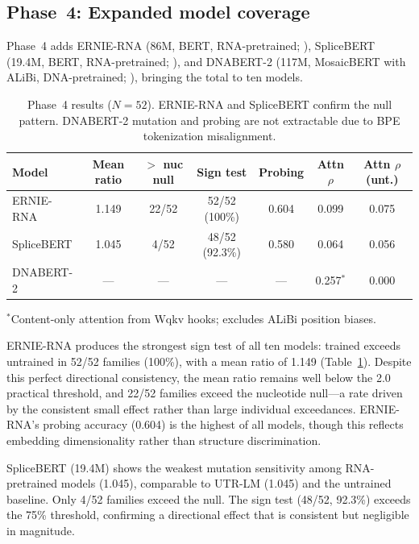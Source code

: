 \documentclass[11pt]{article}
\begin{document}
\subsection{Phase~4: Expanded model coverage}
\label{sec:phase4}

Phase~4 adds ERNIE-RNA (86M, BERT, RNA-pretrained;
\citealp{wang2024ernierna}), SpliceBERT (19.4M, BERT,
RNA-pretrained; \citealp{chen2024splicebert}), and DNABERT-2 (117M,
MosaicBERT with ALiBi, DNA-pretrained; \citealp{zhou2024dnabert2}),
bringing the total to ten models.

\begin{table}[t]
\centering
\caption{Phase~4 results ($N = 52$).  ERNIE-RNA and SpliceBERT
  confirm the null pattern.  DNABERT-2 mutation and probing are not
  extractable due to BPE tokenization misalignment.}
\label{tab:phase4}
\begin{tabular}{@{}lcccccc@{}}
\toprule
\textbf{Model} & \textbf{Mean ratio} & \textbf{$>$ nuc null} &
  \textbf{Sign test} & \textbf{Probing} &
  \textbf{Attn $\rho$} & \textbf{Attn $\rho$ (unt.)} \\
\midrule
ERNIE-RNA  & 1.149 & 22/52 & 52/52 (100\%) & 0.604 & 0.099 & 0.075 \\
SpliceBERT & 1.045 & 4/52  & 48/52 (92.3\%) & 0.580 & 0.064 & 0.056 \\
DNABERT-2  & ---   & ---   & ---            & ---   & 0.257$^*$ & 0.000 \\
\bottomrule
\end{tabular}
\medskip

\small $^*$Content-only attention from Wqkv hooks; excludes ALiBi
position biases.
\end{table}

ERNIE-RNA produces the strongest sign test of all ten models: trained
exceeds untrained in 52/52 families (100\%), with a mean ratio of
1.149 (Table~\ref{tab:phase4}).  Despite this perfect directional
consistency, the mean ratio remains well below the 2.0 practical
threshold, and 22/52 families exceed the nucleotide null---a rate
driven by the consistent small effect rather than large individual
exceedances.  ERNIE-RNA's probing accuracy (0.604) is the highest of
all models, though this reflects embedding dimensionality rather than
structure discrimination.

SpliceBERT (19.4M) shows the weakest mutation sensitivity among
RNA-pretrained models (1.045), comparable to UTR-LM (1.045) and the
untrained baseline.  Only 4/52 families exceed the null.  The sign
test (48/52, 92.3\%) exceeds the 75\% threshold, confirming a
directional effect that is consistent but negligible in magnitude.
\end{document}

